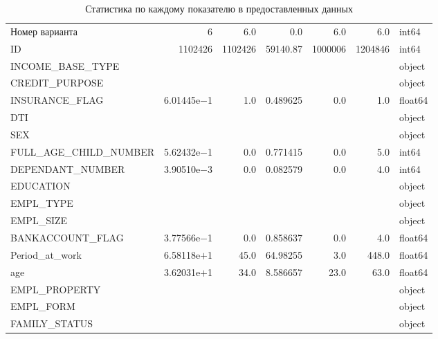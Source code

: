 \documentclass[12pt,a4paper]{article}
\begin{document}
\begin{longtable}{l|rrrrr|l}
    \bottomrule
    \caption{Статистика по каждому показателю в предоставленных данных}\label{table:minmax}
    \endlastfoot
    Номер варианта           & 6            & 6.0      & 0.0      & 6.0     & 6.0     & int64   \\
    ID                       & 1102426      & 1102426  & 59140.87 & 1000006 & 1204846 & int64   \\
    INCOME\_BASE\_TYPE       &              &          &          &         &         & object  \\
    CREDIT\_PURPOSE          &              &          &          &         &         & object  \\
    INSURANCE\_FLAG          & 6.01445e$-$1 & 1.0      & 0.489625 & 0.0     & 1.0     & float64 \\
    DTI                      &              &          &          &         &         & object  \\
    SEX                      &              &          &          &         &         & object  \\
    FULL\_AGE\_CHILD\_NUMBER & 5.62432e$-$1 & 0.0      & 0.771415 & 0.0     & 5.0     & int64   \\
    DEPENDANT\_NUMBER        & 3.90510e$-$3 & 0.0      & 0.082579 & 0.0     & 4.0     & int64   \\
    EDUCATION                &              &          &          &         &         & object  \\
    EMPL\_TYPE               &              &          &          &         &         & object  \\
    EMPL\_SIZE               &              &          &          &         &         & object  \\
    BANKACCOUNT\_FLAG        & 3.77566e$-$1 & 0.0      & 0.858637 & 0.0     & 4.0     & float64 \\
    Period\_at\_work         & 6.58118e$+$1 & 45.0     & 64.98255 & 3.0     & 448.0   & float64 \\
    age                      & 3.62031e$+$1 & 34.0     & 8.586657 & 23.0    & 63.0    & float64 \\
    EMPL\_PROPERTY           &              &          &          &         &         & object  \\
    EMPL\_FORM               &              &          &          &         &         & object  \\
    FAMILY\_STATUS           &              &          &          &         &         & object  \\

\end{longtable}
\end{document}
